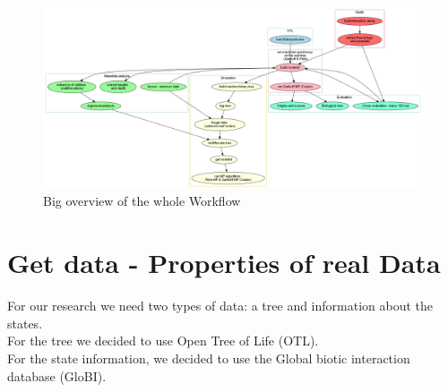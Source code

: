   
  \begin{figure}[h!]
    \centering
    \includegraphics[width=1\textwidth]{Figures/Workflow.png}
    \caption{Big overview of the whole Workflow}
    \label{fig:Workflow}
  \end{figure}

  \section{Get data - Properties of real Data}
    For our research we need two types of data: a tree and information about the states. \\
    For the tree we decided to use Open Tree of Life (OTL). \\
    For the state information, we decided to use the Global biotic interaction database (GloBI).

